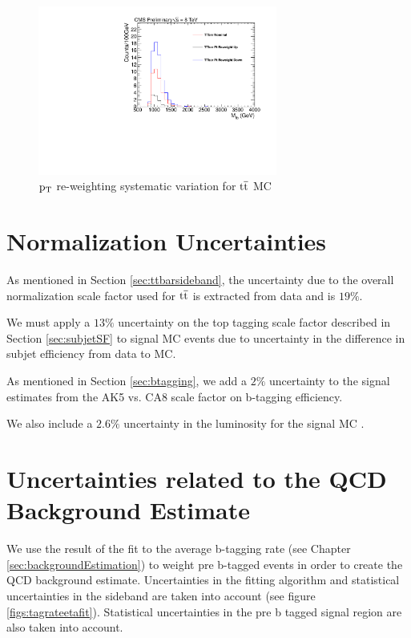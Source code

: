 \begin{figure}[htcb]
\begin{center}
\includegraphics[width=0.7\textwidth]{AN-13-004/figs/TTbar_PTReweighting}
\caption{
$\mathrm{p_{T}}$ re-weighting systematic variation for $\mathrm{t\overline{t}}$ MC 
}
\label{figs:ptreweight}
\end{center}
\end{figure}

\section{Normalization Uncertainties}
As mentioned in Section \ref{sec:ttbarsideband}, the uncertainty due to the overall normalization scale factor used for $\mathrm{t\overline{t}}$ is extracted from data and is $19\%$.   

We must apply a $13\%$ uncertainty on the top tagging scale factor described in Section \ref{sec:subjetSF} to signal MC events due to uncertainty in the difference in subjet efficiency from data to MC.

As mentioned in Section \ref{sec:btagging}, we add a $2\%$ uncertainty to the signal estimates from the AK5 vs. CA8 scale factor on b-tagging efficiency. 

We also include a $2.6\%$ uncertainty in the luminosity for the signal MC \cite{CMS-PAS-LUM-13-001}. 


\clearpage
\section{Uncertainties related to the QCD Background Estimate}
We use the result of the fit to the average b-tagging rate (see Chapter \ref{sec:backgroundEstimation}) to weight 
pre b-tagged events in order to create the QCD background estimate.  Uncertainties in
the fitting algorithm and statistical uncertainties in the sideband
are taken into account (see figure \ref{figs:tagrateetafit}).
Statistical uncertainties in the pre b tagged signal region are also
taken into account.

